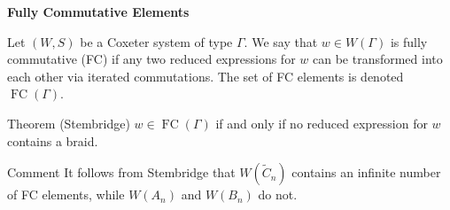 \documentclass{beamer}
\DeclareMathOperator{\FC}{FC}
\newcommand{\C}{\widetilde{C}}
\begin{document}
\begin{frame}{\textbf{Fully Commutative Elements}}
\begin{definition}
Let $(W,S)$ be a Coxeter system of type $\Gamma$. We say that $w \in W(\Gamma)$ is \alert{fully commutative} (\alert{FC}) if any two reduced expressions for $w$ can be transformed into each other via iterated commutations. The set of FC elements is denoted $\FC(\Gamma)$.	
\end{definition}

\pause

\begin{block}{Theorem (Stembridge)}
$w \in \FC(\Gamma)$ if and only if no reduced expression for $w$ contains a braid.
\end{block}

\pause

\begin{block}{Comment}
	It follows from Stembridge that $W(\C_n)$ contains an infinite number of FC elements, while $W(A_n)$ and $W(B_n)$ do not. 
\end{block}

\end{frame}

\end{document}
